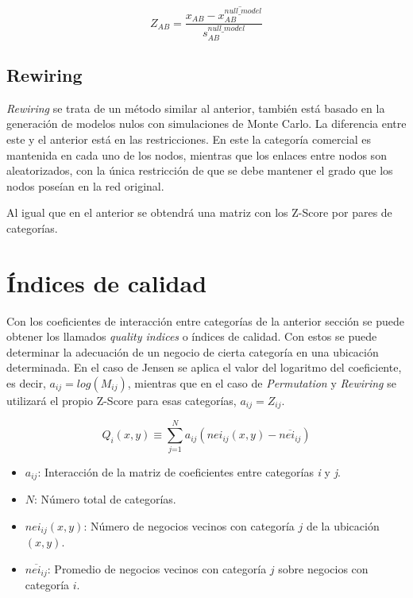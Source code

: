 \begin{equation*}
	Z_{AB} = \frac{x_{AB} - \overline{x_{AB}^{null\_model}}}{s_{AB}^{null\_model}}
\end{equation*}



\subsection{Rewiring}

\textit{Rewiring} se trata de un método similar al anterior, también está basado en la generación de modelos nulos con simulaciones de Monte Carlo. La diferencia entre este y el anterior está en las restricciones. En este la categoría comercial es mantenida en cada uno de los nodos, mientras que los enlaces entre nodos son aleatorizados, con la única restricción de que se debe mantener el grado que los nodos poseían en la red original.

Al igual que en el anterior se obtendrá una matriz con los Z-Score por pares de categorías.



\section{Índices de calidad}

Con los coeficientes de interacción entre categorías de la anterior sección se puede obtener los llamados \textit{quality indices} o índices de calidad. Con estos se puede determinar la adecuación de un negocio de cierta categoría en una ubicación determinada. En el caso de Jensen se aplica el valor del logaritmo del coeficiente, es decir, $a_{ij} = log(M_{ij})$, mientras que en el caso de \textit{Permutation} y \textit{Rewiring} se utilizará el propio Z-Score para esas categorías, $a_{ij} = Z_{ij}$. 

\begin{equation*}
	Q_i(x,y) \equiv \sum_\textit{j=1}^N a_{ij} (nei_{ij}(x,y) - \overline{nei_{ij}})
\end{equation*}



\begin{itemize}
	\item $a_{ij}$: Interacción de la matriz de coeficientes entre categorías \textit{i} y \textit{j}.
	\item $N$: Número total de categorías.
	\item $nei_{ij}(x,y)$: Número de negocios vecinos con categoría $j$ de la ubicación $(x,y)$.
	\item $\overline{nei_{ij}}$: Promedio de negocios vecinos con categoría $j$ sobre negocios con categoría $i$.
\end{itemize}

